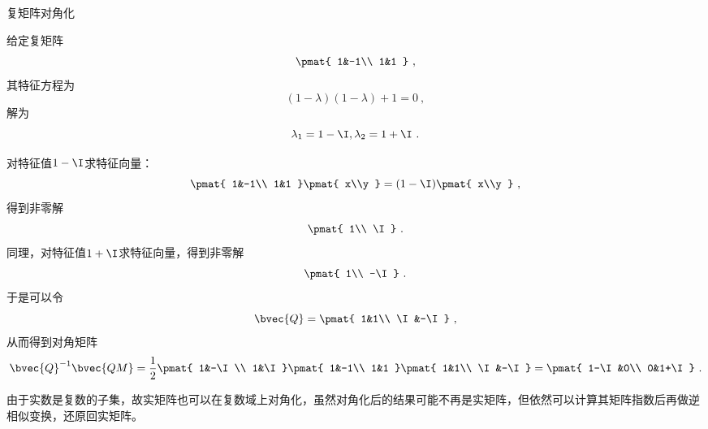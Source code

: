 \begin{example}{复矩阵对角化}

给定复矩阵
\begin{equation}
\pmat{
    1&-1\\
    1&1
}~, 
\end{equation}
其特征方程为
\begin{equation}
(1-\lambda)(1-\lambda)+1=0~, 
\end{equation}
解为
\begin{equation}
\lambda_1 = 1-\I, \lambda_2 = 1+\I~. 
\end{equation}

对特征值$1-\I$求特征向量：
\begin{equation}
\pmat{
    1&-1\\
    1&1
}
\pmat{
    x\\y
}
=
(1-\I)
\pmat{
    x\\y
}~, 
\end{equation}
得到非零解
\begin{equation}
\pmat{
1\\ \I
}~. 
\end{equation}
同理，对特征值$1+\I$求特征向量，得到非零解
\begin{equation}
\pmat{
1\\ -\I
}~. 
\end{equation}
于是可以令
\begin{equation}
\bvec{Q} = 
\pmat{
    1&1\\
    \I&-\I
}~, 
\end{equation}
从而得到对角矩阵
\begin{equation}
\bvec{Q}^{-1}\bvec{QM} = 
\frac{1}{2}
\pmat{
1&-\I\\
1&\I
}
\pmat{
1&-1\\
1&1
}
\pmat{
    1&1\\
    \I&-\I
}
=
\pmat{
    1-\I&0\\
    0&1+\I
}
~. 
\end{equation}

\end{example}


由于实数是复数的子集，故实矩阵也可以在复数域上对角化，虽然对角化后的结果可能不再是实矩阵，但依然可以计算其矩阵指数后再做逆相似变换，还原回实矩阵。














